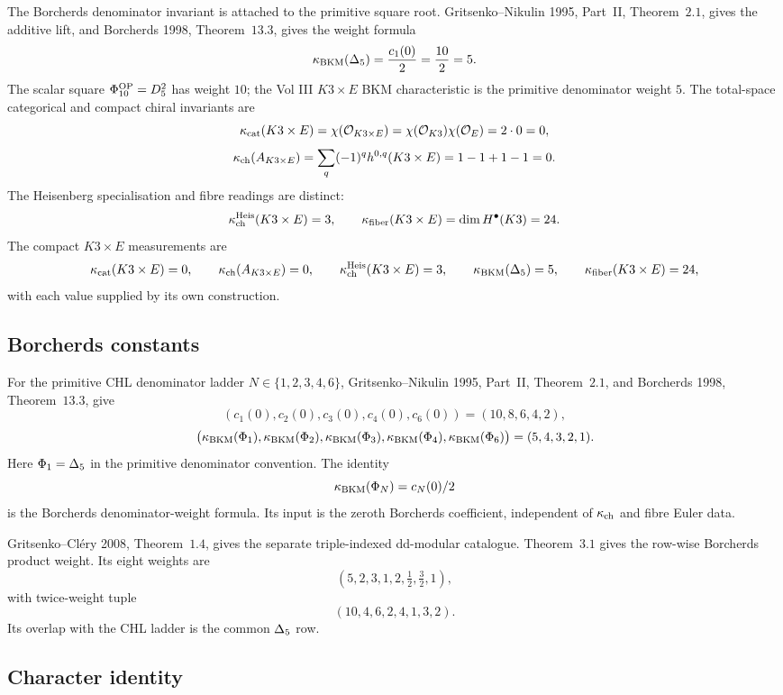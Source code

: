 The Borcherds denominator invariant is attached to the primitive
square root. Gritsenko--Nikulin 1995, Part~II, Theorem~$2.1$, gives
the additive lift, and Borcherds 1998, Theorem~$13.3$, gives the
weight formula
\[
  \kappa_{\mathrm{BKM}}(\Delta_5)=\frac{c_1(0)}{2}=\frac{10}{2}=5.
\]
The scalar square \(\Phi_{10}^{\mathrm{OP}}=D_5^2\) has weight \(10\); the Vol III
\(K3\times E\) BKM characteristic is the primitive denominator weight
\(5\). The total-space categorical and compact chiral invariants are
\[
  \kappa_{\mathrm{cat}}(K3\times E)
  =
  \chi(\mathcal O_{K3\times E})
  =
  \chi(\mathcal O_{K3})\chi(\mathcal O_E)
  =
  2\cdot 0
  =
  0,
\]
\[
  \kappa_{\mathrm{ch}}(A_{K3\times E})
  =
  \sum_q(-1)^q h^{0,q}(K3\times E)
  =
  1-1+1-1
  =
  0.
\]
The Heisenberg specialisation and fibre readings are distinct:
\[
  \kappa_{\mathrm{ch}}^{\mathrm{Heis}}(K3\times E)=3,\qquad
  \kappa_{\mathrm{fiber}}(K3\times E)=\dim H^\bullet(K3)=24.
\]
The compact $K3\times E$ measurements are
\[
  \kappa_{\mathrm{cat}}(K3\times E)=0,\qquad
  \kappa_{\mathrm{ch}}(A_{K3\times E})=0,\qquad
  \kappa_{\mathrm{ch}}^{\mathrm{Heis}}(K3\times E)=3,\qquad
  \kappa_{\mathrm{BKM}}(\Delta_5)=5,\qquad
  \kappa_{\mathrm{fiber}}(K3\times E)=24,
\]
with each value supplied by its own construction.

\subsection*{Borcherds constants}

For the primitive CHL denominator ladder \(N\in\{1,2,3,4,6\}\),
Gritsenko--Nikulin 1995, Part~II, Theorem~$2.1$, and Borcherds 1998,
Theorem~$13.3$, give
\[
  (c_1(0),c_2(0),c_3(0),c_4(0),c_6(0))
  =
  (10,8,6,4,2),
\]
\[
  \bigl(
    \kappa_{\mathrm{BKM}}(\Phi_1),
    \kappa_{\mathrm{BKM}}(\Phi_2),
    \kappa_{\mathrm{BKM}}(\Phi_3),
    \kappa_{\mathrm{BKM}}(\Phi_4),
    \kappa_{\mathrm{BKM}}(\Phi_6)
  \bigr)
  =
  (5,4,3,2,1).
\]
Here \(\Phi_1=\Delta_5\) in the primitive denominator convention. The
identity
\[
  \kappa_{\mathrm{BKM}}(\Phi_N)=c_N(0)/2
\]
is the Borcherds denominator-weight formula. Its input is the zeroth
Borcherds coefficient, independent of $\kappa_{\mathrm{ch}}$ and fibre Euler data.

Gritsenko--Cl\'ery 2008, Theorem~$1.4$, gives the separate
triple-indexed dd-modular catalogue. Theorem~$3.1$ gives the row-wise
Borcherds product weight. Its eight weights are
\[
  (5,2,3,1,2,\tfrac12,\tfrac32,1),
\]
with twice-weight tuple
\[
  (10,4,6,2,4,1,3,2).
\]
Its overlap with the CHL ladder is the common \(\Delta_5\) row.

\subsection*{Character identity}

